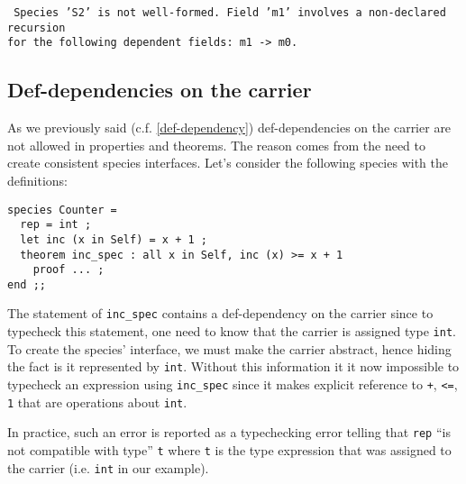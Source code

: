 \noindent
{\scriptsize
{\tt
Species 'S2' is not well-formed. Field
'm1' involves a non-declared recursion\\
for the following dependent fields: m1 -> m0.
}
}



\subsection{Def-dependencies on the carrier}
\label{def-dep-on-carrier}
As we previously said (c.f. \ref{def-dependency}) def-dependencies on
the carrier are not allowed in properties and theorems. The reason
comes from the need to create consistent species interfaces. Let's
consider the following species with the definitions:
{\scriptsize
\begin{lstlisting}
species Counter =
  rep = int ;
  let inc (x in Self) = x + 1 ;
  theorem inc_spec : all x in Self, inc (x) >= x + 1
    proof ... ;
end ;;
\end{lstlisting}
}

The statement of {\tt inc\_spec} contains a def-dependency on the
carrier since to typecheck this statement, one need to know that the
carrier is assigned type {\tt int}. To create the species' interface,
we must make the carrier abstract, hence hiding the fact is it
represented by {\tt int}. Without this information it it now
impossible to typecheck an expression using {\tt inc\_spec} since it
makes explicit reference to {\tt +}, {\tt <=}, {\tt 1} that are
operations about {\tt int}.

In practice, such an error is reported as a typechecking error telling
that {\tt rep} ``is not compatible with type'' {\tt t} where {\tt t}
is the type expression that was assigned to the carrier (i.e.
{\tt int} in 
our example).

